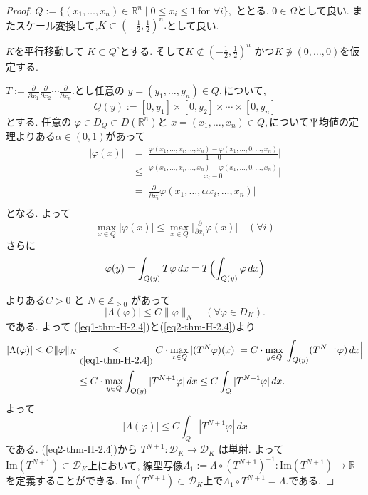 \begin{proof}
\(
Q := \{ (x_1,\ldots,x_n) \in \mathbb{R}^n \mid 0 \leq x_i \leq 1 \ \text{for } \forall i \},
\)
ととる. $0 \in\Omega$として良い. 
またスケール変換して,\(K \subset (-\tfrac{1}{2},\tfrac{1}{2})^n.\)として良い. 

$K$を平行移動して  $K \subset Q^\circ$とする. 
そして\(K \not\subset (-\tfrac{1}{2},\tfrac{1}{2})^n\) かつ\(K \not\ni (0,\ldots,0)\)を仮定する. 

\(
T := \frac{\partial}{\partial x_1}\frac{\partial}{\partial x_2}\cdots \frac{\partial}{\partial x_n}.
\)とし任意の \(y=(y_1,\ldots,y_n)\in Q,\)について, 
\[
 Q(y) := [0,y_1] \times [0,y_2] \times \cdots \times [0,y_n]
 \]
とする. 
任意の \(\varphi \in D_{Q} \subset D(\mathbb{R}^n)\)と \(x=(x_1,\ldots,x_n)\in Q,\)について平均値の定理よりある\(\alpha \in (0,1)\)があって
\begin{align*}
|\varphi(x)|
&=
\biggl| \frac{\varphi(x_1,\ldots,x_i,\ldots,x_n) - \varphi(x_1,\ldots,0,\ldots,x_n)}{1- 0} \biggr| \\
&\le \biggl| \frac{\varphi(x_1,\ldots,x_i,\ldots,x_n) - \varphi(x_1,\ldots,0,\ldots,x_n)}{x_i - 0} \biggr| \\
&= \biggl| \frac{\partial}{\partial x_i} \varphi(x_1,\ldots,\alpha x_i,\ldots,x_n) \biggr| \\
\end{align*}
となる. 
よって
\begin{equation}
\label{eq1-thm-H-2.4}
 \max_{x \in Q} |\varphi(x)| \leq \max_{x \in Q} \bigl| \tfrac{\partial}{\partial x_i}\varphi(x)\bigr| \quad (\forall i)
 \end{equation}
さらに
\begin{equation}
\label{eq2-thm-H-2.4}
\varphi(y) = \int_{Q(y)} T\varphi \, dx = T\Bigl( \int_{Q(y)} \varphi \, dx \Bigr) 
\end{equation}

\cite[Thm 6.8]{Rud}よりある\(C>0\) と \( N \in \mathbb{Z}_{\geq 0}\) があって
\[
|\Lambda(\varphi)| \leq C \|\varphi\|_N \quad (\forall \varphi \in D_K).
\]
である. よって
(\ref{eq1-thm-H-2.4})と(\ref{eq2-thm-H-2.4})より
\begin{align*}
|\Lambda(\varphi)| 
\leq C \|\varphi\|_N 
& \underset{(\ref{eq1-thm-H-2.4} )}{\leq} C \cdot \max_{x \in Q} |(T^N \varphi)(x)| 
= C \cdot \max_{y \in Q} \Bigl| \int_{Q(y)} (T^{N+1}\varphi)\, dx \Bigr| \\
&\leq C \cdot \max_{y \in Q} \int_{Q(y)} |T^{N+1}\varphi| \, dx 
\leq C \int_Q |T^{N+1}\varphi| \, dx.
\end{align*}
よって
\begin{equation}
\label{eq3-thm-H-2.4}
|\Lambda(\varphi)| \leq C \int_Q |T^{N+1}\varphi| \, dx
\end{equation}
である. 
(\ref{eq2-thm-H-2.4})から \(T^{N+1} : \mathcal{D}_K \to \mathcal{D}_K\) は単射.
よって$\mathrm{Im}(T^{N+1}) \subset \mathcal{D}_K$上において, 
線型写像\(\Lambda_1 := \Lambda \circ (T^{N+1})^{-1} : \mathrm{Im}(T^{N+1})  \to \mathbb{R}\)を定義することができる. 
$\mathrm{Im}(T^{N+1}) \subset \mathcal{D}_K$上で\(\Lambda_1 \circ T^{N+1} = \Lambda.\)である. 


\end{proof}
